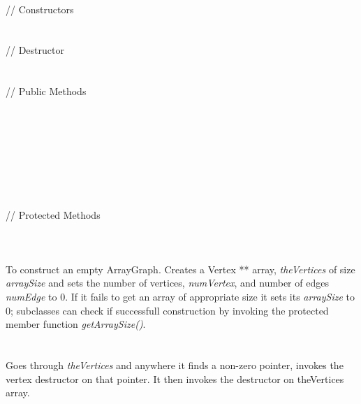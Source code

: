   \\
\indent\indent // Constructors  \\
\indent{}  \\ \\
\indent\indent // Destructor  \\
\indent{}  \\ \\
\indent\indent // Public Methods   \\
\indent{}  \\
\indent{} \\
\indent{} \\
\indent{} \\
\indent{} \\
\indent{} \\
\indent{} \\ \\
\indent\indent // Protected Methods \\
\indent{} \\


  \\
  \\
To construct an empty ArrayGraph. Creates a Vertex ** array, {\em
theVertices} of size {\em arraySize} and sets the number of vertices,
{\em numVertex}, and number of edges {\em numEdge} to $0$. If it fails
to get an array of appropriate size it sets its {\em arraySize} to
$0$; subclasses can check if successfull construction by invoking the
protected member function {\em getArraySize()}. \\

  \\
  \\
Goes through {\em theVertices} and anywhere it finds a non-zero pointer,
invokes the vertex destructor on that pointer. It then invokes the
destructor on theVertices array. \\


